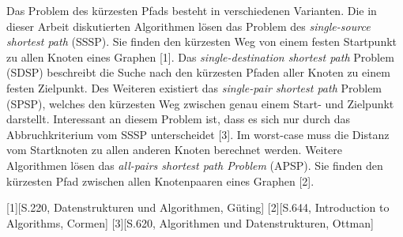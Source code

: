 Das Problem des kürzesten Pfads besteht in verschiedenen Varianten. Die in dieser Arbeit diskutierten Algorithmen lösen das Problem des \textit{single-source shortest path} (SSSP). Sie finden den kürzesten Weg von einem festen Startpunkt zu allen Knoten eines Graphen [1]. Das \textit{single-destination shortest path} Problem (SDSP)  beschreibt die Suche nach den kürzesten Pfaden aller Knoten zu einem festen Zielpunkt. Des Weiteren existiert das \textit{single-pair shortest path} Problem (SPSP), welches den kürzesten Weg zwischen genau einem Start- und Zielpunkt darstellt. Interessant an diesem Problem ist, dass es sich nur durch das Abbruchkriterium vom SSSP unterscheidet [3]. Im worst-case muss die Distanz vom Startknoten zu allen anderen Knoten berechnet werden. Weitere Algorithmen lösen das \textit{all-pairs shortest path Problem} (APSP). Sie finden den kürzesten Pfad zwischen allen Knotenpaaren eines Graphen [2].


[1][S.220, Datenstrukturen und Algorithmen, Güting]
[2][S.644, Introduction to Algorithms, Cormen]
[3][S.620, Algorithmen und Datenstrukturen, Ottman]